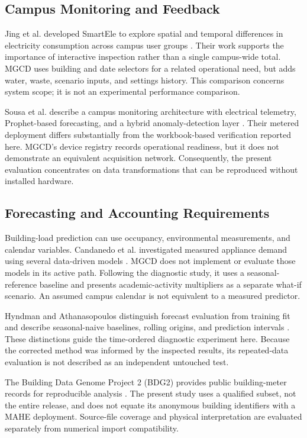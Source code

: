 \documentclass[conference]{IEEEtran}
\begin{document}
\subsection{Campus Monitoring and Feedback}
Jing et al. developed SmartEle to explore spatial and temporal differences in electricity consumption across campus user groups \cite{smartele}. Their work supports the importance of interactive inspection rather than a single campus-wide total. MGCD uses building and date selectors for a related operational need, but adds water, waste, scenario inputs, and settings history. This comparison concerns system scope; it is not an experimental performance comparison.

Sousa et al. describe a campus monitoring architecture with electrical telemetry, Prophet-based forecasting, and a hybrid anomaly-detection layer \cite{sousa}. Their metered deployment differs substantially from the workbook-based verification reported here. MGCD's device registry records operational readiness, but it does not demonstrate an equivalent acquisition network. Consequently, the present evaluation concentrates on data transformations that can be reproduced without installed hardware.

\subsection{Forecasting and Accounting Requirements}
Building-load prediction can use occupancy, environmental measurements, and calendar variables. Candanedo et al. investigated measured appliance demand using several data-driven models \cite{candanedo}. MGCD does not implement or evaluate those models in its active path. Following the diagnostic study, it uses a seasonal-reference baseline and presents academic-activity multipliers as a separate what-if scenario. An assumed campus calendar is not equivalent to a measured predictor.

Hyndman and Athanasopoulos distinguish forecast evaluation from training fit and describe seasonal-naive baselines, rolling origins, and prediction intervals \cite{fpp}. These distinctions guide the time-ordered diagnostic experiment here. Because the corrected method was informed by the inspected results, its repeated-data evaluation is not described as an independent untouched test.

The Building Data Genome Project 2 (BDG2) provides public building-meter records for reproducible analysis \cite{bdg2}. The present study uses a qualified subset, not the entire release, and does not equate its anonymous building identifiers with a MAHE deployment. Source-file coverage and physical interpretation are evaluated separately from numerical import compatibility.
\end{document}
